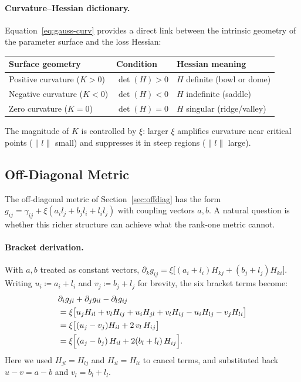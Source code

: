 \documentclass{article}
\begin{document}
\paragraph{Curvature--Hessian dictionary.}
Equation~\eqref{eq:gauss-curv} provides a direct link between the
intrinsic geometry of the parameter surface and the loss Hessian:
\begin{center}
\small
\begin{tabular}{@{}lll@{}}
    \toprule
    \textbf{Surface geometry} & \textbf{Condition} & \textbf{Hessian meaning} \\
    \midrule
    Positive curvature ($K>0$) & $\det(H)>0$ & $H$ definite (bowl or dome) \\
    Negative curvature ($K<0$) & $\det(H)<0$ & $H$ indefinite (saddle) \\
    Zero curvature ($K=0$)     & $\det(H)=0$ & $H$ singular (ridge/valley) \\
    \bottomrule
\end{tabular}
\end{center}
The magnitude of $K$ is controlled by $\xi$:
larger $\xi$ amplifies curvature near critical points ($\|l\|$ small)
and suppresses it in steep regions ($\|l\|$ large).

\subsection{Off-Diagonal Metric}\label{sec:geodesic-offdiag}

The off-diagonal metric of Section~\ref{sec:offdiag}
has the form
$g_{ij}=\gamma_{ij}+\xi(a_i l_j + b_j l_i + l_i l_j)$
with coupling vectors $a,b$.
A natural question is whether this richer structure
can achieve what the rank-one metric cannot.

\paragraph{Bracket derivation.}
With $a,b$ treated as constant vectors,
$\partial_k g_{ij} = \xi\bigl[(a_i+l_i)H_{kj} + (b_j+l_j)H_{ki}\bigr]$.
Writing $u_i \coloneqq a_i + l_i$ and $v_j \coloneqq b_j + l_j$
for brevity, the six bracket terms become:
\begin{align}
    &\partial_i g_{jl} + \partial_j g_{il} - \partial_l g_{ij} \nonumber\\
    &= \xi\bigl[
      u_j H_{il} + v_l H_{ij}
    + u_i H_{jl} + v_l H_{ij}
    - u_i H_{lj} - v_j H_{li}
    \bigr] \nonumber\\
    &= \xi\bigl[
      (u_j - v_j) H_{il} + 2\,v_l\,H_{ij}
    \bigr] \label{eq:offdiag-bracket}\\
    &= \xi\Bigl[(a_j - b_j)\,H_{il} + 2(b_l + l_l)\,H_{ij}\Bigr]. \nonumber
\end{align}
Here we used $H_{jl}=H_{lj}$ and $H_{il}=H_{li}$ to cancel terms,
and substituted back $u-v = a-b$ and $v_l = b_l + l_l$.
\end{document}
